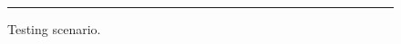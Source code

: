 \begin{figure}[t!]

\caption{Testing scenario.\label{testing:scenario}}
\sspace
\hrule
\end{figure}
